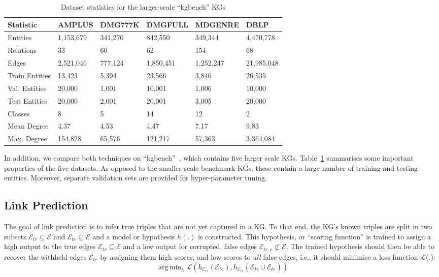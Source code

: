 \documentclass{llncs}
\DeclareMathOperator*{\argmin}{arg\,min}
\begin{document}
\setlength{\tabcolsep}{3pt}
\begin{table}[h!]
\begin{center}
 
\begin{tabular}{llllll}\toprule
 \textbf{Statistic}          &  \textbf{AMPLUS} &  \textbf{DMG777K}   &  \textbf{DMGFULL} &  \textbf{MDGENRE} &  \textbf{DBLP}\\\midrule
Entities  &  1,153,679  & 341,270  & 842,550 & 349,344 & 4,470,778 \\
Relations  & 33  & 60  & 62 & 154 & 68  \\
Edges  & 2,521,046 & 777,124 & 1,850,451 & 1,252,247 & 21,985,048 \\
Train Entities  & 13,423 & 5,394 & 23,566 & 3,846 & 26,535  \\
Val. Entities  & 20,000 & 1,001 & 10,001 & 1,006 & 10,000 \\
Test Entities  & 20,000 & 2,001 & 20,001 & 3,005 & 20,000 \\
Classes  & 8  & 5  & 14 & 12 & 2 \\
Mean Degree & 4.37 & 4.53 & 4.47 & 7.17 & 9.83 \\
Max. Degree & 154,828 & 65,576 & 121,217 & 57,363 & 3,364,084 \\ \bottomrule
\end{tabular}
\end{center}
\caption{Dataset statistics for the larger-scale ``kgbench'' KGs\label{table:statistics2}}
\end{table}

In addition, we compare both techniques on ``kgbench''~\cite{bloem2021kgbench}, which contains five larger scale KGs. Table~\ref{table:statistics2} summarises some important properties of the five datasets. As opposed to the smaller-scale benchmark KGs, these contain a large number of training and testing entities. Moreover, separate validation sets are provided for hyper-parameter tuning.

\subsection{Link Prediction}
The goal of link prediction is to infer true triples that are not yet captured in a KG. To that end, the KG's known triples are split in two subsets $\mathcal{E}_{tr} \subseteq \mathcal{E}$ and $\mathcal{E}_{te} \subseteq \mathcal{E}$ and a model or hypothesis $h(.)$ is constructed. This hypothesis, or ``scoring function'' is trained to assign a high output to the true edges $\mathcal{E}_{tr} \subseteq \mathcal{E}$ and a low output for corrupted, false edges $\mathcal{E}_{tr,c} \not\subset \mathcal{E}$.
The trained hypothesis should then be able to recover the withheld edges $\mathcal{E}_{te}$ by assigning them high scores, and low scores to \textit{all} false edges, i.e., it should minimise a loss function $\mathcal{L}$(.):
\begin{equation}
    \argmin_{h} \mathcal{L}(h_{\mathcal{E}_{tr}}(\mathcal{E}_{te}), h_{\mathcal{E}_{tr}}(\overline{\mathcal{E}_{tr} \cup \mathcal{E}_{te}}))
\end{equation}
\end{document}

